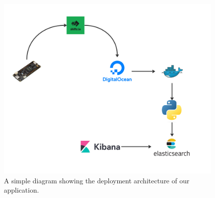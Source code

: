 \begin{figure}[H]
    \centering
    \includegraphics[width=\textwidth]{../assets/png/solar-station-arch}
    \caption{A simple diagram showing the deployment architecture of our application.}
    \label{fig:do}
\end{figure}\